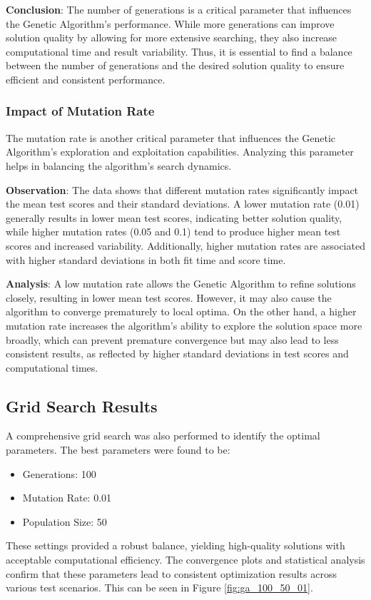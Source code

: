 \documentclass{article}
\begin{document}
    \textbf{Conclusion}: The number of generations is a critical parameter that influences the Genetic Algorithm's performance. While more generations can improve solution quality by allowing for more extensive searching, they also increase computational time and result variability. Thus, it is essential to find a balance between the number of generations and the desired solution quality to ensure efficient and consistent performance.

    \subsubsection{Impact of Mutation Rate}

    The mutation rate is another critical parameter that influences the Genetic Algorithm’s exploration and exploitation capabilities. Analyzing this parameter helps in balancing the algorithm’s search dynamics.

    \textbf{Observation}: The data shows that different mutation rates significantly impact the mean test scores and their standard deviations. A lower mutation rate (0.01) generally results in lower mean test scores, indicating better solution quality, while higher mutation rates (0.05 and 0.1) tend to produce higher mean test scores and increased variability. Additionally, higher mutation rates are associated with higher standard deviations in both fit time and score time.

    \textbf{Analysis}: A low mutation rate allows the Genetic Algorithm to refine solutions closely, resulting in lower mean test scores. However, it may also cause the algorithm to converge prematurely to local optima. On the other hand, a higher mutation rate increases the algorithm's ability to explore the solution space more broadly, which can prevent premature convergence but may also lead to less consistent results, as reflected by higher standard deviations in test scores and computational times.

    \subsection{Grid Search Results}
    A comprehensive grid search was also performed to identify the optimal parameters. The best parameters were found to be:
    \begin{itemize}
        \item Generations: 100
        \item Mutation Rate: 0.01
        \item Population Size: 50
    \end{itemize}
    These settings provided a robust balance, yielding high-quality solutions with acceptable computational efficiency. The convergence plots and statistical analysis confirm that these parameters lead to consistent optimization results across various test scenarios. This can be seen in Figure \ref{fig:ga_100_50_01}.
\end{document}
